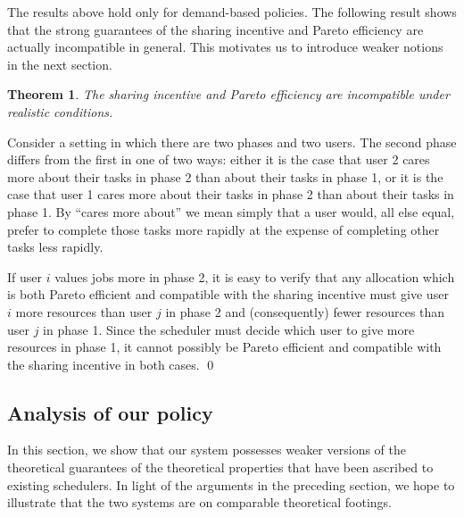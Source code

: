 \documentclass{acm_proc_article-sp}
\newtheorem{theorem}{Theorem}[section]
\newenvironment{pproof}[1][Proof]{\begin{trivlist}
\item[\hskip \labelsep {\bfseries #1}]}{\end{trivlist}}
\begin{document}
The results above hold only for demand-based policies.
The following result shows that the strong guarantees of the sharing
incentive and Pareto efficiency are actually incompatible in general.
This motivates us to introduce weaker notions in the next section.
\vspace{-5mm}
\begin{theorem}\label{no-efficiency}
The sharing incentive and Pareto efficiency are incompatible under realistic conditions.
\end{theorem}
\vspace{-5mm}
\begin{pproof}
Consider a setting in which there are two phases and two users. 
The second phase differs from the first in one of two ways: 
either it is the case that user 2 cares more about their tasks in phase 2 than about their tasks in phase 1, 
or it is the case that user 1 cares more about their tasks in phase 2 than about their tasks in phase 1. 
By ``cares more about'' we mean simply that a user would, all else equal, 
prefer to complete those tasks more rapidly at the expense of completing other tasks less rapidly.

If user $i$ values jobs more in phase 2, it is easy to verify that any allocation which is both Pareto efficient and compatible with the sharing incentive must give user $i$ 
more resources than user $j$ in phase 2 and (consequently) fewer resources than user $j$ in phase 1. 
Since the scheduler must decide which user to give more resources in phase 1, it cannot possibly be Pareto efficient and compatible with the sharing incentive in both cases. \qed
\end{pproof}

\subsection{Analysis of our policy}
In this section, we show that our system possesses weaker versions of the theoretical guarantees of the theoretical properties that have been ascribed to existing schedulers. In light of the arguments in the preceding section, we hope to illustrate that the two systems are on comparable theoretical footings.
\end{document}
